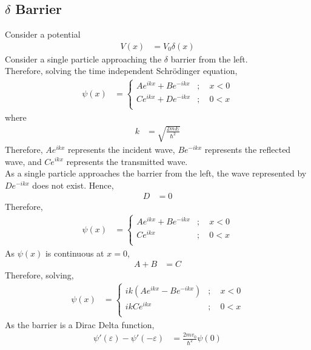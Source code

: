 \documentclass[titlepage, fleqn, a4paper, 12pt, twoside]{article}
\theoremstyle{definition}
\theoremstyle{theorem}
\begin{document}
\subsection{$\delta$ Barrier}

Consider a potential
\begin{align*}
	V(x) &= V_0 \delta(x)
\end{align*}
Consider a single particle approaching the $\delta$ barrier from the left.\\
Therefore, solving the time independent Schrödinger equation,
\begin{align*}
	\psi(x) &=
		\begin{cases}
			A e^{i k x} + B e^{-i k x} &;\quad x < 0\\
			C e^{i k x} + D e^{-i k x} &;\quad 0 < x\\
		\end{cases}
\end{align*}
where
\begin{align*}
	k &= \sqrt{\frac{2 m E}{\hbar^2}}
\end{align*}
Therefore, $A e^{i k x}$ represents the incident wave, $B e^{-i k x}$ represents the reflected wave, and $C e^{i k x}$ represents the transmitted wave.\\
As a single particle approaches the barrier from the left, the wave represented by $D e^{-i k x}$ does not exist.
Hence,
\begin{align*}
	D &= 0
\end{align*}
Therefore,
\begin{align*}
	\psi(x) &=
		\begin{cases}
			A e^{i k x} + B e^{-i k x} &;\quad x < 0\\
			C e^{i k x} &;\quad 0 < x\\
		\end{cases}
\end{align*}
As $\psi(x)$ is continuous at $x = 0$,
\begin{align*}
	A + B &= C
\end{align*}
Therefore, solving,
\begin{align*}
	\psi(x) &=
		\begin{cases}
			i k \left( A e^{i k x} - B e^{-i k x} \right) &;\quad x < 0\\
			i k C e^{i k x} &;\quad 0 < x\\
		\end{cases}
\end{align*}
As the barrier is a Dirac Delta function,
\begin{align*}
	\psi'(\varepsilon) - \psi'(-\varepsilon) &= \frac{2 m v_0}{\hbar^2} \psi(0)
\end{align*}
\end{document}
